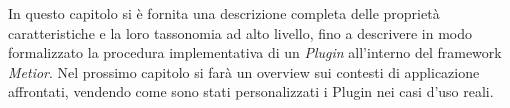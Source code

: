 In questo capitolo si è fornita una descrizione completa delle
proprietà caratteristiche e la loro tassonomia ad alto livello, fino a descrivere in modo formalizzato
la procedura implementativa di un \emph{Plugin} all'interno del framework \emph{Metior}.
Nel prossimo capitolo si farà un overview sui contesti di applicazione affrontati, vendendo
come sono stati personalizzati i Plugin nei casi d'uso reali.
